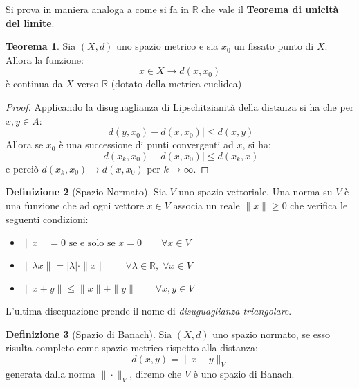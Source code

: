 \documentclass[a4paper,twoside]{article}
\newcommand{\R}{\mathbb{R}}
\theoremstyle{definition}
\newtheorem{theorem}{\color{Red}\underline{\textrm Teorema}}
\newtheorem{definizione}[theorem]{Definizione}
\numberwithin{theorem}{section}
\begin{document}
Si prova in maniera analoga a come si fa in $\R$ che vale il \textbf{Teorema di unicità del limite}.
\begin{theorem}
Sia $(X,d)$ uno spazio metrico e sia $x_0$ un fissato punto di $X$. Allora la funzione: $$x\in X\to d(x,x_0)$$
è continua da $X$ verso $\R$ (dotato della metrica euclidea)
\end{theorem}
\begin{proof}
    Applicando la disuguaglianza di Lipschitzianità della distanza si ha che per $x,y\in A$:
    $$|d(y,x_0)-d(x,x_0)|\leq d(x,y)$$
    Allora se $x_0$ è una successione di punti convergenti ad $x$, si ha: 
    $$|d(x_k,x_0)-d(x,x_0)|\leq d(x_k,x)$$
    e perciò $d(x_k,x_0)\to d(x,x_0)\text{ per } k\to\infty$.
\end{proof}
\begin{definizione}[Spazio Normato]
Sia $V$ uno spazio vettoriale. Una norma su $V$ è una funzione che ad ogni vettore $x\in V$ associa un reale $\|x\|\geq 0$ che verifica le seguenti condizioni:
\begin{itemize}
    \item $\|x\|=0 \text{ se e solo se } x=0 \qquad \forall x\in V$
    \item $\|\lambda x\|=|\lambda|\cdot\|x\|\qquad \forall\lambda\in\R,\; \forall x\in V$
    \item $\|x+y\|\leq \|x\|+\|y\|\qquad \forall x,y\in V$
\end{itemize}
\end{definizione}
L'ultima disequazione prende il nome di \emph{disuguaglianza triangolare}.
\begin{definizione}[Spazio di Banach]
Sia $(X,d)$ uno spazio normato, se esso risulta completo come spazio metrico rispetto alla distanza: $$d(x,y)=\|x-y\|_V$$ generata dalla norma $\|\cdot\|_V$, diremo che $V$ è uno spazio di Banach.    
\end{definizione}
\end{document}

